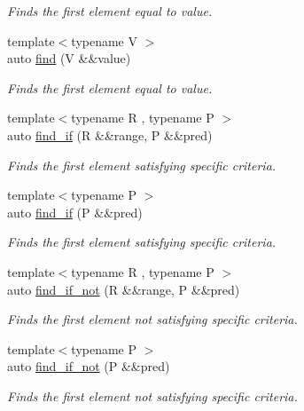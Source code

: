 \begin{DoxyCompactItemize}
\begin{DoxyCompactList}\small\item\em Finds the first element equal to value. \end{DoxyCompactList}\item 
{\footnotesize template$<$typename V $>$ }\\auto \mbox{\hyperlink{namespacerah_a37f60e134164914703fdd0508f83ee11}{find}} (V \&\&value)
\begin{DoxyCompactList}\small\item\em Finds the first element equal to value. \end{DoxyCompactList}\item 
{\footnotesize template$<$typename R , typename P $>$ }\\auto \mbox{\hyperlink{namespacerah_acbd71a185a2510e691dcd715a31edf53}{find\+\_\+if}} (R \&\&range, P \&\&pred)
\begin{DoxyCompactList}\small\item\em Finds the first element satisfying specific criteria. \end{DoxyCompactList}\item 
{\footnotesize template$<$typename P $>$ }\\auto \mbox{\hyperlink{namespacerah_a04200b08ecdef8daf99f04c58f29e459}{find\+\_\+if}} (P \&\&pred)
\begin{DoxyCompactList}\small\item\em Finds the first element satisfying specific criteria. \end{DoxyCompactList}\item 
{\footnotesize template$<$typename R , typename P $>$ }\\auto \mbox{\hyperlink{namespacerah_af758ef3c67d20ba6260319cb0e0171c5}{find\+\_\+if\+\_\+not}} (R \&\&range, P \&\&pred)
\begin{DoxyCompactList}\small\item\em Finds the first element not satisfying specific criteria. \end{DoxyCompactList}\item 
{\footnotesize template$<$typename P $>$ }\\auto \mbox{\hyperlink{namespacerah_a406c37a2cf758e7329bfd696a6bf8f89}{find\+\_\+if\+\_\+not}} (P \&\&pred)
\begin{DoxyCompactList}\small\item\em Finds the first element not satisfying specific criteria. \end{DoxyCompactList}\item 

\end{DoxyCompactItemize}
